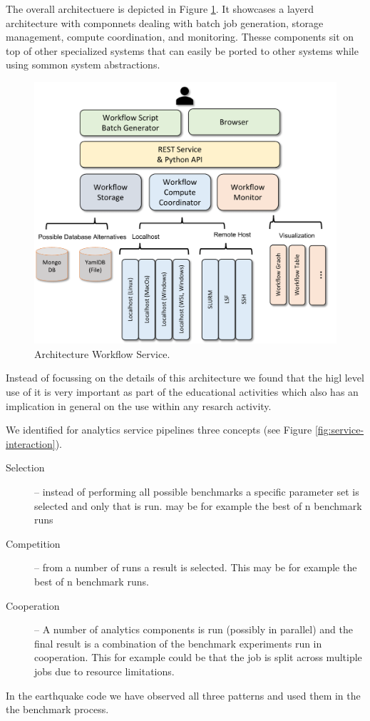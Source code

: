 \documentclass[utf8]{FrontiersinVancouver} %
\begin{document}
The overall architectuere is depicted in Figure \ref{fig:cc-2}. It
showcases a layerd architecture with componnets dealing with batch job
generation, storage management, compute coordination, and
monitoring. Thesse components sit on top of other specialized systems
that can easily be ported to other systems while using sommon system
abstractions.


\begin{figure}[htb]
    \centering
    \includegraphics[width=0.50\columnwidth]{images/cloudmesh-cc-new.pdf}
    \caption{Architecture Workflow Service.}
    \label{fig:cc-2}
\end{figure}

Instead of focussing on the details of this architecture we found that
the higl level use of it is very important as part of the educational
activities which also has an implication in general on the use within
any resarch activity.

We identified for analytics service pipelines three concepts (see
Figure \ref{fig:service-interaction}).

\begin{description}
\item [Selection] -- instead of performing all possible benchmarks a
  specific parameter set is selected and only that is run.  may be for
  example the best of n benchmark runs
\item [Competition] -- from a number of runs a result is selected. This
  may be for example the best of n benchmark runs.
\item [Cooperation] -- A number of analytics components is run
  (possibly in parallel) and the final result is a combination of the
  benchmark experiments run in cooperation. This for example could be
  that the job is split across multiple jobs due to resource
  limitations.
\end{description}

In the earthquake code we have observed all three patterns and used
them in the the benchmark process.
\end{document}
